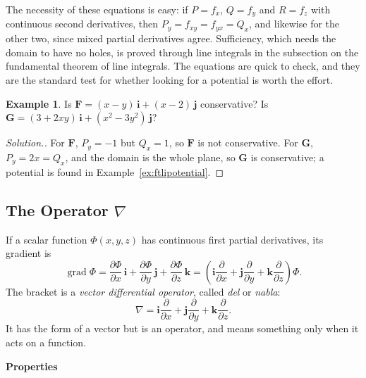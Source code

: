 \documentclass[11pt,a4paper]{article}
\DeclareMathOperator{\grad}{grad}
\theoremstyle{definition}
\newtheorem{exa}[thm]{Example}
\newenvironment{solution}
  {\renewcommand{\qedsymbol}{}\begin{proof}[\textit{Solution}.]}
  {\end{proof}}
\newcommand{\subhead}[1]{%
  \par\medskip\noindent\textbf{#1}\par\nobreak\smallskip}
\begin{document}
The necessity of these equations is easy: if $P = f_x$, $Q = f_y$ and
$R = f_z$ with continuous second derivatives, then
$P_y = f_{xy} = f_{yx} = Q_x$, and likewise for the other two, since mixed
partial derivatives agree. Sufficiency, which needs the domain to have no holes,
is proved through line integrals in the subsection on the fundamental theorem of
line integrals. The equations are quick to check, and they are the standard
test for whether looking for a potential is worth the effort.

\begin{exa}
\label{ex:notconservative}
Is $\mathbf F = (x - y)\,\mathbf i + (x - 2)\,\mathbf j$ conservative? Is
$\mathbf G = (3 + 2xy)\,\mathbf i + (x^2 - 3y^2)\,\mathbf j$?
\end{exa}

\begin{solution}
For $\mathbf F$, $P_y = -1$ but $Q_x = 1$, so $\mathbf F$ is not conservative.
For $\mathbf G$, $P_y = 2x = Q_x$, and the domain is the whole plane, so
$\mathbf G$ is conservative; a potential is found in
Example~\ref{ex:ftlipotential}.
\end{solution}

{\color[wave]{485}\subsection{The Operator $\nabla$}}

If a scalar function $\Phi (x,y,z)$ has continuous first partial derivatives,
its gradient is
\[\grad \Phi = \frac{\partial \Phi}{\partial x}\,\mathbf i + \frac{\partial
\Phi}{\partial y}\,\mathbf j + \frac{\partial \Phi}{\partial z}\,\mathbf k =
\left(\mathbf i\frac{\partial}{\partial x} + \mathbf j \frac{\partial}{\partial
y} + \mathbf k \frac{\partial}{\partial z}\right) \Phi .\]
The bracket is a \emph{vector differential operator}, called \emph{del} or
\emph{nabla}:
\[\nabla = \mathbf i \frac{\partial}{\partial x} + \mathbf j\frac{\partial}
{\partial y} + \mathbf k \frac{\partial}{\partial z} .\]
It has the form of a vector but is an operator, and means something only when it
acts on a function.

\subhead{Properties}
\end{document}

